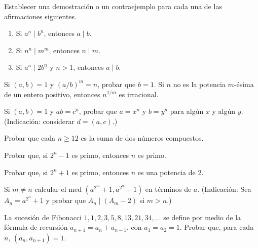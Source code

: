 \documentclass[12pt,a4paper]{book}
\begin{document}
    \begin{ejercicio}
        Establecer una demostración o un contraejemplo para cada una de las afirmaciones
        siguientes.
        \begin{enumerate}
            \item[(a)] Si $a^{n}\mid b^{n}$, entonces $a\mid b$.
            \item[(b)] Si $n^{n}\mid m^{m}$, entonces $n\mid m$.
            \item[(c)] Si $a^{n}\mid 2b^{n}$ y $n>1$, entonces $a\mid b$.
        \end{enumerate}
    \end{ejercicio}

    \begin{ejercicio}
        Si $(a,b)=1$ y $(a/b)^{m}=n$, probar que $b=1$. Si $n$ no es la potencia $m$-ésima de
        un entero positivo, entonces $n^{1/m}$ es irracional.
    \end{ejercicio}

    \begin{ejercicio}
        Si $(a,b)=1$ y $ab=c^{n}$, probar que $a=x^{n}$ y $b=y^{n}$ para algún $x$ y algún $y$.
        (Indicación: considerar $d=(a,c)$.)
    \end{ejercicio}

    \begin{ejercicio}
        Probar que cada $n\geq12$ es la suma de dos números compuestos.
    \end{ejercicio}

    \begin{ejercicio}
        Probar que, si $2^{n}-1$ es primo, entonces $n$ es primo.
    \end{ejercicio}

    \begin{ejercicio}
        Probar que, si $2^{n}+1$ es primo, entonces $n$ es una potencia de 2.
    \end{ejercicio}

    \begin{ejercicio}
        Si $m\neq n$ calcular el mcd $(a^{2^{m}}+1,a^{2^{n}}+1)$ en términos de $a$.
        (Indicación: Sea $A_{n}=a^{2^{n}}+1$ y probar que $A_{n}\mid(A_{m}-2)$ si $m>n$.)
    \end{ejercicio}

    \begin{ejercicio}
        La sucesión de Fibonacci $1,1,2,3,5,8,13,21,34,\dots$ se define por medio de la
        fórmula de recursión $a_{n+1}=a_{n}+a_{n-1}$, con $a_{1}=a_{2}=1$. Probar que, para cada
        $n$, $(a_{n},a_{n+1})=1$.
    \end{ejercicio}
\end{document}
